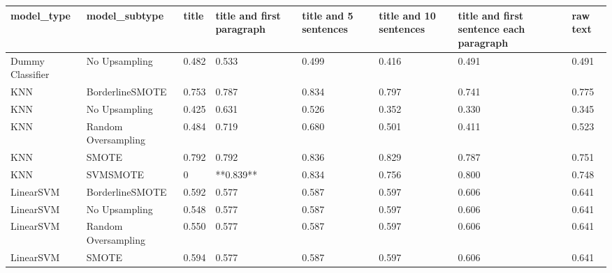 \begin{tabular}{llllllll}
\toprule
                  model\_type &       model\_subtype & title & title and first paragraph & title and 5 sentences & title and 10 sentences & title and first sentence each paragraph & raw text \\
\midrule
            Dummy Classifier &       No Upsampling & 0.482 &                     0.533 &                 0.499 &                  0.416 &                                   0.491 &    0.491 \\
                         KNN &     BorderlineSMOTE & 0.753 &                     0.787 &                 0.834 &                  0.797 &                                   0.741 &    0.775 \\
                         KNN &       No Upsampling & 0.425 &                     0.631 &                 0.526 &                  0.352 &                                   0.330 &    0.345 \\
                         KNN & Random Oversampling & 0.484 &                     0.719 &                 0.680 &                  0.501 &                                   0.411 &    0.523 \\
                         KNN &               SMOTE & 0.792 &                     0.792 &                 0.836 &                  0.829 &                                   0.787 &    0.751 \\
                         KNN &            SVMSMOTE &     0 &                 **0.839** &                 0.834 &                  0.756 &                                   0.800 &    0.748 \\
                   LinearSVM &     BorderlineSMOTE & 0.592 &                     0.577 &                 0.587 &                  0.597 &                                   0.606 &    0.641 \\
                   LinearSVM &       No Upsampling & 0.548 &                     0.577 &                 0.587 &                  0.597 &                                   0.606 &    0.641 \\
                   LinearSVM & Random Oversampling & 0.550 &                     0.577 &                 0.587 &                  0.597 &                                   0.606 &    0.641 \\
                   LinearSVM &               SMOTE & 0.594 &                     0.577 &                 0.587 &                  0.597 &                                   0.606 &    0.641 \\

\end{tabular}
